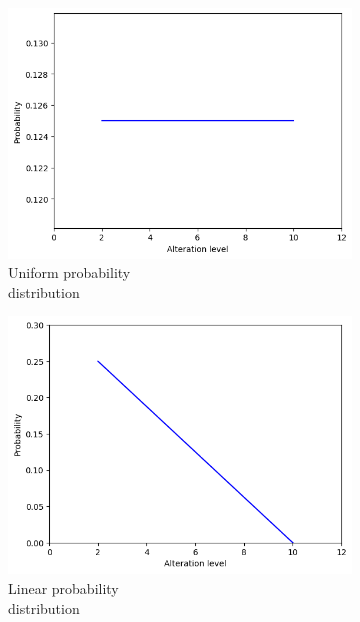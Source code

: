 \begin{figure}[h]
	\centering
	\begin{subfigure}{.33\textwidth}
		\centering
		\includegraphics[width=0.9\linewidth]{ImageFiles/ANNRob/unifo_prob}
		\caption{Uniform probability \\ distribution}
		\label{fig:unifo_prob}
	\end{subfigure}%
	\begin{subfigure}{.33\textwidth}
		\centering
		\includegraphics[width=0.9\linewidth]{ImageFiles/ANNRob/lin_prob}
		\caption{Linear probability \\ distribution}
		\label{fig:lin_prob}
	\end{subfigure}%
	\begin{subfigure}{.33\textwidth}
		\centering

\end{subfigure}
\end{figure}
